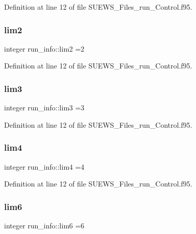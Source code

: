 Definition at line 12 of file S\+U\+E\+W\+S\+\_\+\+Files\+\_\+run\+\_\+\+Control.\+f95.

\mbox{\label{namespacerun__info_af89da03470d913f288c8deaa72c81e98}} 
\subsubsection{\texorpdfstring{lim2}{lim2}}
{\footnotesize\ttfamily integer run\+\_\+info\+::lim2 =2}



Definition at line 12 of file S\+U\+E\+W\+S\+\_\+\+Files\+\_\+run\+\_\+\+Control.\+f95.

\mbox{\label{namespacerun__info_ad7a71d5b6da02d9fe343cf50247e63f1}} 
\subsubsection{\texorpdfstring{lim3}{lim3}}
{\footnotesize\ttfamily integer run\+\_\+info\+::lim3 =3}



Definition at line 12 of file S\+U\+E\+W\+S\+\_\+\+Files\+\_\+run\+\_\+\+Control.\+f95.

\mbox{\label{namespacerun__info_a776a112d5d931e6d58195aac621d98c8}} 
\subsubsection{\texorpdfstring{lim4}{lim4}}
{\footnotesize\ttfamily integer run\+\_\+info\+::lim4 =4}



Definition at line 12 of file S\+U\+E\+W\+S\+\_\+\+Files\+\_\+run\+\_\+\+Control.\+f95.

\mbox{\label{namespacerun__info_a30737240d73cc13facaa16e6234df127}} 
\subsubsection{\texorpdfstring{lim6}{lim6}}
{\footnotesize\ttfamily integer run\+\_\+info\+::lim6 =6}



